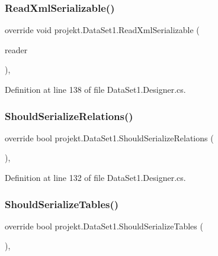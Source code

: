 \subsubsection{Read\+Xml\+Serializable()}
{\footnotesize\ttfamily override void projekt.\+Data\+Set1.\+Read\+Xml\+Serializable (\begin{DoxyParamCaption}\item[{global\+::\+System.\+Xml.\+Xml\+Reader}]{reader }\end{DoxyParamCaption})\hspace{0.3cm}{\ttfamily [inline]}, {\ttfamily [protected]}}



Definition at line 138 of file Data\+Set1.\+Designer.\+cs.

\mbox{\label{classprojekt_1_1DataSet1_a59de6c98c70128509a6461654eea2766}} 
\subsubsection{Should\+Serialize\+Relations()}
{\footnotesize\ttfamily override bool projekt.\+Data\+Set1.\+Should\+Serialize\+Relations (\begin{DoxyParamCaption}{ }\end{DoxyParamCaption})\hspace{0.3cm}{\ttfamily [inline]}, {\ttfamily [protected]}}



Definition at line 132 of file Data\+Set1.\+Designer.\+cs.

\mbox{\label{classprojekt_1_1DataSet1_a3a1de8b5f42f1062608d6c1c683cd5bd}} 
\subsubsection{Should\+Serialize\+Tables()}
{\footnotesize\ttfamily override bool projekt.\+Data\+Set1.\+Should\+Serialize\+Tables (\begin{DoxyParamCaption}{ }\end{DoxyParamCaption})\hspace{0.3cm}{\ttfamily [inline]}, {\ttfamily [protected]}}



